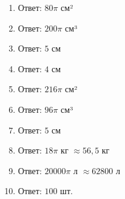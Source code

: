\documentclass{umk-matematika}
\begin{document}
\begin{enumerate}
  \item Ответ: $80\pi$ см²
  \item Ответ: $200\pi$ см³
  \item Ответ: $5$ см
  \item Ответ: $4$ см
  \item Ответ: $216\pi$ см²
  \item Ответ: $96\pi$ см³
  \item Ответ: $5$ см
  \item Ответ: $18\pi$ кг $\approx 56{,}5$ кг
  \item Ответ: $20000\pi$ л $\approx 62800$ л
  \item Ответ: $100$ шт.
\end{enumerate}
\end{document}
